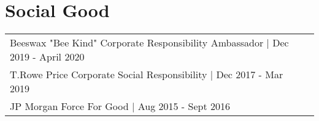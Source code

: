 \documentclass[letterpaper]{deedy-resume-openfont} %
\begin{document}
\begin{minipage}[t]{0.66\textwidth}






\sectionspace %


\section{Social Good}
 \begin{tabular}{lll}
 Beeswax "Bee Kind" Corporate Responsibility Ambassador | Dec 2019 - April 2020 \\
 T.Rowe Price Corporate Social Responsibility | Dec 2017 - Mar 2019 \\
 JP Morgan Force For Good | Aug 2015 - Sept 2016 \\
\end{tabular}





\end{minipage} %
\end{document}
